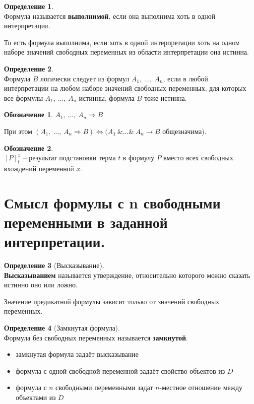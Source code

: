 \documentclass[a4paper,12pt]{article}
\theoremstyle{definition} %
\newtheorem{definition}{Определение}[section]
\newtheorem{notation}{Обозначение}[section]
\theoremstyle{definition} %
\theoremstyle{remark} %
\begin{document}
	\begin{definition}\ \\[1ex]
		Формула называется \textbf{выполнимой}, если она выполнима хоть в одной интерпретации.
	\end{definition}

	То есть формула выполнима, если хоть в одной интерпретации хоть на одном наборе значений свободных переменных из области интерпретации она истинна.
	
	\begin{definition}\ \\[1ex]
		Формула $B$ логически следует из формул $A_1, \ \dots , \ A_n$, если в любой интерпретации на любом наборе значений свободных переменных, для которых все формулы $A_1, \ \dots , \ A_n$ истинны, формула $B$ тоже истинна.
	\end{definition}

	\begin{notation}
		$A_1, \ \dots , \ A_n \Rightarrow B$
	\end{notation}
	При этом $(A_1, \ \dots , \ A_n \Rightarrow B) \Leftrightarrow (A_1 \ \& \dots \& \ A_n \rightarrow B$ общезначима).
	
	\begin{notation}\ \\[1ex]
		$[P]_{t}^{x}$ -- результат подстановки терма $t$ в формулу $P$ вместо всех свободных вхождений переменной $x$.
	\end{notation}

\section{Смысл формулы с n свободными переменными в заданной интерпретации.}
	\begin{definition}[Высказывание]\ \\[1ex]
		\textbf{Высказыванием} называется утверждение, относительно которого можно сказать истинно оно или ложно.
	\end{definition}

	Значение предикатной формулы зависит только от значений свободных переменных.
	
	\begin{definition}[Замкнутая формула]\ \\[1ex]
		Формула без свободных переменных называется \textbf{замкнутой}.
	\end{definition}
	
	\begin{itemize}
		\item замкнутая формула задаёт высказывание
		\item формула с одной свободной переменной задаёт свойство объектов из $D$
		\item формула с $n$ свободными переменными задат $n$-местное отношение между объектами из $D$
	\end{itemize}
	
\end{document}
